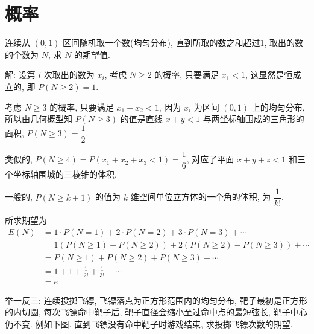 \chapter{概率}

连续从 $ (0,1) $ 区间随机取一个数(均匀分布), 直到所取的数之和超过1, 取出的数的个数为 $ N $, 求 $ N $ 的期望值.

解: 设第 $ i $ 次取出的数为 $ x_i $, 考虑 $ N\ge 2 $ 的概率, 只要满足 $ x_1<1 $, 这显然是恒成立的, 即 $ P(N\ge 2)=1 $.

考虑 $ N\ge 3 $ 的概率, 只要满足 $ x_1+x_2<1 $, 因为 $ x_i $ 为区间 $ (0,1) $ 上的均匀分布, 所以由几何概型知 $ P(N\ge 3) $ 的值是直线 $ x+y<1 $ 与两坐标轴围成的三角形的面积, $ P(N\ge 3)=\dfrac{1}{2} $.

类似的, $ P(N\ge 4)=P(x_1+x_2+x_3<1)=\dfrac{1}{6} $, 对应了平面 $ x+y+z<1 $ 和三个坐标轴围城的三棱锥的体积.

一般的, $ P(N\ge k+1) $ 的值为 $ k $ 维空间单位立方体的一个角的体积, 为 $ \dfrac{1}{k!} $.

所求期望为
\begin{align*}
E(N) &= 1\cdot P(N=1) + 2\cdot P(N=2) + 3\cdot P(N=3) + \cdots \\
	&= 1(P(N\ge 1) - P(N\ge 2)) + 2(P(N\ge 2) - P(N\ge 3)) + \cdots \\
	&= P(N\ge 1) + P(N\ge 2) + P(N\ge 3) + \cdots \\
	&= 1 + 1 + \frac{1}{2!} + \frac{1}{3!} + \cdots \\
	&= e
\end{align*}


举一反三: 连续投掷飞镖, 飞镖落点为正方形范围内的均匀分布, 靶子最初是正方形的内切圆, 每次飞镖命中靶子后, 靶子直径会缩小至过命中点的最短弦长, 靶子中心仍不变. 例如下图. 直到飞镖没有命中靶子时游戏结束, 求投掷飞镖次数的期望.

